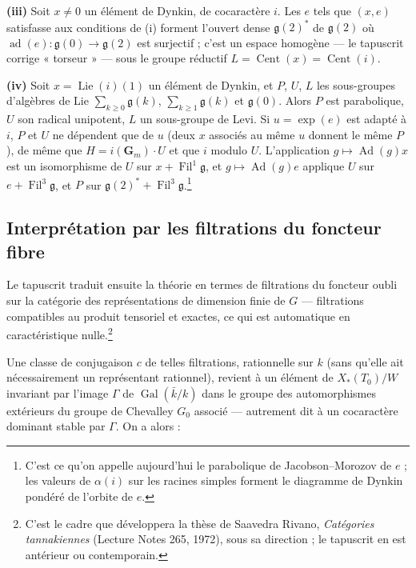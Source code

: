 \documentclass[11pt,a4paper]{article}
\begin{document}
\textbf{(iii)} Soit $x\neq 0$ un élément de Dynkin, de cocaractère $i$. Les $e$
tels que $(x,e)$ satisfasse aux conditions de (i) forment l'ouvert dense
$\mathfrak{g}(2)^{*}$ de $\mathfrak{g}(2)$ où
$\operatorname{ad}(e)\colon\mathfrak{g}(0)\to\mathfrak{g}(2)$ est surjectif ;
c'est un espace homogène — le tapuscrit corrige « torseur » — sous le groupe
réductif $L=\operatorname{Cent}(x)=\operatorname{Cent}(i)$.

\textbf{(iv)} Soit $x=\operatorname{Lie}(i)(1)$ un élément de Dynkin, et $P$,
$U$, $L$ les sous-groupes d'algèbres de Lie
$\sum_{k\geqslant 0}\mathfrak{g}(k)$, $\sum_{k\geqslant 1}\mathfrak{g}(k)$ et
$\mathfrak{g}(0)$. Alors $P$ est parabolique, $U$ son radical unipotent, $L$ un
sous-groupe de Levi. Si $u=\exp(e)$ est adapté à $i$, $P$ et $U$ ne dépendent
que de $u$ (deux $x$ associés au même $u$ donnent le même $P$), de même que
$H=i(\mathbf{G}_{m})\cdot U$ et que $i$ modulo $U$. L'application
$g\mapsto\operatorname{Ad}(g)x$ est un isomorphisme de $U$ sur
$x+\operatorname{Fil}^{1}\mathfrak{g}$, et $g\mapsto\operatorname{Ad}(g)e$
applique $U$ sur $e+\operatorname{Fil}^{3}\mathfrak{g}$, et $P$ sur
$\mathfrak{g}(2)^{*}+\operatorname{Fil}^{3}\mathfrak{g}$.\footnote{C'est ce
qu'on appelle aujourd'hui le parabolique de Jacobson--Morozov de $e$ ; les
valeurs de $\alpha(i)$ sur les racines simples forment le diagramme de Dynkin
pondéré de l'orbite de $e$.}

\subsection*{Interprétation par les filtrations du foncteur fibre}

Le tapuscrit traduit ensuite la théorie en termes de filtrations du foncteur
oubli sur la catégorie des représentations de dimension finie de $G$ —
filtrations compatibles au produit tensoriel et exactes, ce qui est
automatique en caractéristique nulle.\footnote{C'est le cadre que développera
la thèse de Saavedra Rivano, \emph{Catégories tannakiennes} (Lecture Notes 265,
1972), sous sa direction ; le tapuscrit en est antérieur ou contemporain.}

Une classe de conjugaison $c$ de telles filtrations, rationnelle sur $k$
(sans qu'elle ait nécessairement un représentant rationnel), revient à un
élément de $X_{*}(T_{0})/W$ invariant par l'image $\Gamma$ de
$\operatorname{Gal}(\bar k/k)$ dans le groupe des automorphismes extérieurs du
groupe de Chevalley $G_{0}$ associé — autrement dit à un cocaractère dominant
stable par $\Gamma$. On a alors :
\end{document}
